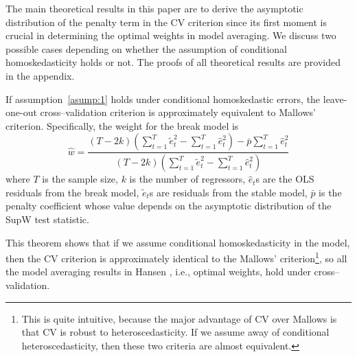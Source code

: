 \documentclass[a4paper,12pt]{article}
\begin{document}
The main theoretical results in this paper are to derive the asymptotic distribution of the penalty term in the CV criterion since its first moment is crucial in determining the optimal weights in model averaging. We discuss two possible cases depending on whether the assumption of conditional homoskedasticity holds or not. The proofs of all theoretical results are provided in the appendix.
\begin{theorem} \label{thm:1}
If assumption~\ref{asump:1} holds under conditional homoskedastic errors, the leave-one-out cross--validation criterion is approximately equivalent to Mallows' criterion. Specifically, the weight for the break model is
\begin{equation}
\hat{w} = \frac{(T - 2k)(\sum_{t=1}^{T}\tilde{e}_{t}^{2} - \sum_{t=1}^{T}\hat{e}_{t}^{2}) - \bar{p}\sum_{t=1}^{T}\hat{e}_{t}^{2}}{(T - 2k)(\sum_{t=1}^{T}\tilde{e}_{t}^{2} - \sum_{t=1}^{T}\hat{e}_{t}^{2})}
\end{equation}
where $T$ is the sample size, $k$ is the number of regressors, $\hat{e}_t$s are the OLS residuals from the break model, $\tilde{e}_t$s are residuals from the stable model, $\bar{p}$ is the penalty coefficient whose value depends on the asymptotic distribution of the SupW test statistic.
\end{theorem}
This theorem shows that if we assume conditional homoskedasticity in the model, then the CV criterion is approximately identical to the Mallows' criterion\footnote{This is quite intuitive, because the major advantage of CV over Mallows is that CV is robust to heteroscedasticity. If we assume away of conditional heteroscedasticity, then these two criteria are almost equivalent.}, so all the model averaging results in Hansen \cite{hansen2009averaging}, i.e., optimal weights, hold under cross--validation.
\end{document}
